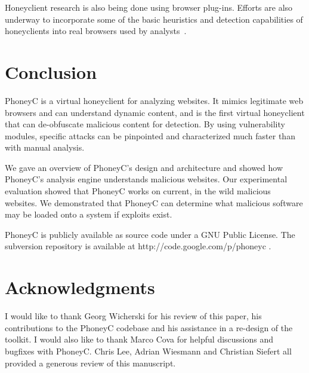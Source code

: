 \documentclass[10pt,twocolumn]{article}
\begin{document}
Honeyclient research is also being done using browser plug-ins. Efforts are also underway to incorporate some of the basic heuristics and detection capabilities of honeyclients into real browsers used by analysts~\cite{hallaraker2005dmj}. 

\section{Conclusion}
\label{conclusion}

PhoneyC is a virtual honeyclient for analyzing websites. It mimics legitimate web browsers and can understand dynamic content, and is the first virtual honeyclient that can de-obfuscate malicious content for detection. By using vulnerability modules, specific attacks can be pinpointed and characterized much faster than with manual analysis. 

We gave an overview of PhoneyC's design and architecture and showed how PhoneyC's analysis engine understands malicious websites. Our experimental evaluation showed that PhoneyC works on current, in the wild malicious websites. We demonstrated that PhoneyC can determine what malicious software may be loaded onto a system if exploits exist. 

PhoneyC is publicly available as source code under a GNU Public License. The subversion repository is available at http://code.google.com/p/phoneyc .

\section*{Acknowledgments}
\label{acks}

I would like to thank Georg Wicherski for his review of this paper, his contributions to the PhoneyC codebase and his assistance in a re-design of the toolkit. I would also like to thank Marco Cova for helpful discussions and bugfixes with PhoneyC. Chris Lee, Adrian Wiesmann and Christian Siefert all provided a generous review of this manuscript.

\scriptsize


\normalsize
\end{document}
